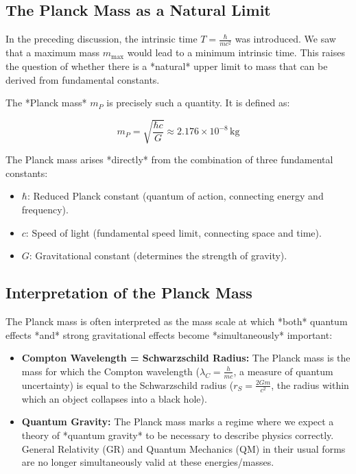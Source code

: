 \documentclass{article}
\begin{document}
\subsection{The Planck Mass as a Natural Limit}

In the preceding discussion, the intrinsic time \(T = \frac{\hbar}{mc^2}\) was introduced. We saw that a maximum mass \(m_{\text{max}}\) would lead to a minimum intrinsic time.  This raises the question of whether there is a *natural* upper limit to mass that can be derived from fundamental constants.

The *Planck mass* \(m_P\) is precisely such a quantity. It is defined as:

\begin{equation}
	m_P = \sqrt{\frac{\hbar c}{G}} \approx 2.176 \times 10^{-8} \, \text{kg}
\end{equation}

The Planck mass arises *directly* from the combination of three fundamental constants:

\begin{itemize}
	\item \(\hbar\): Reduced Planck constant (quantum of action, connecting energy and frequency).
	\item \(c\): Speed of light (fundamental speed limit, connecting space and time).
	\item \(G\): Gravitational constant (determines the strength of gravity).
\end{itemize}

\subsection{Interpretation of the Planck Mass}

The Planck mass is often interpreted as the mass scale at which *both* quantum effects *and* strong gravitational effects become *simultaneously* important:

\begin{itemize}
	\item \textbf{Compton Wavelength = Schwarzschild Radius:} The Planck mass is the mass for which the Compton wavelength (\(\lambda_C = \frac{h}{mc}\), a measure of quantum uncertainty) is equal to the Schwarzschild radius (\(r_S = \frac{2Gm}{c^2}\), the radius within which an object collapses into a black hole).
	\item \textbf{Quantum Gravity:} The Planck mass marks a regime where we expect a theory of *quantum gravity* to be necessary to describe physics correctly.  General Relativity (GR) and Quantum Mechanics (QM) in their usual forms are no longer simultaneously valid at these energies/masses.
\end{itemize}
\end{document}
